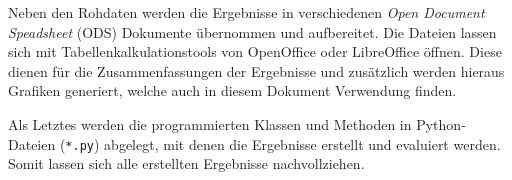 Neben den Rohdaten werden die Ergebnisse in verschiedenen \textit{Open Document Speadsheet} (ODS) Dokumente übernommen und aufbereitet. Die Dateien lassen sich mit Tabellenkalkulationstools von OpenOffice oder LibreOffice öffnen. Diese dienen für die Zusammenfassungen der Ergebnisse und zusätzlich werden hieraus Grafiken generiert, welche auch in diesem Dokument Verwendung finden.\vspace{0.2cm}

Als Letztes werden die programmierten Klassen und Methoden in Python-Dateien (\texttt{*.py}) abgelegt, mit denen die Ergebnisse erstellt und evaluiert werden. Somit lassen sich alle erstellten Ergebnisse nachvollziehen.



